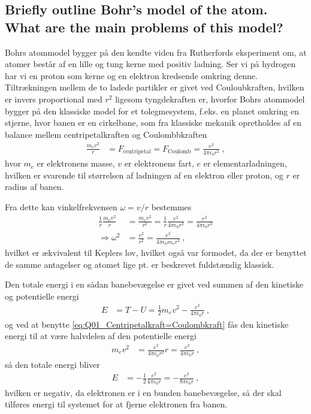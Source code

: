 \subsection{Briefly outline Bohr's model of the atom. What are the main problems of this model?}

Bohrs atommodel bygger på den kendte viden fra Rutherfords eksperiment om, at atomer består af en lille og tung kerne med positiv ladning. Ser vi på hydrogen har vi en proton som kerne og en elektron kredsende omkring denne. Tiltrækningen mellem de to ladede partikler er givet ved Couloubkraften, hvilken er invers proportional med $r^2$ ligesom tyngdekraften er, hvorfor Bohrs atommodel bygger på den klassiske model for et tolegmesystem, f.eks. en planet omkring en stjerne, hvor banen er en cirkelbane, som fra klassiske mekanik opretholdes af en balance mellem centripetalkraften og Coulombbkraften
\begin{align} \label{eq:Q01_Centripetalkraft=Coulombkraft}
	\frac{m_e v^2}{r} &= F_\text{centripetal} = F_\text{Coulomb} = \frac{e^2}{4\pi\epsilon_0 r^2} \: ,
\end{align}
hvor $m_e$ er elektronens masse, $v$ er elektronens fart, $e$ er elementarladningen, hvilken er svarende til størrelsen af ladningen af en elektron eller proton, og $r$ er radius af banen.

Fra dette kan vinkelfrekvensen $\omega = v/r$ bestemmes
\begin{align}
    \frac{1}{r}\frac{m_e v^2}{r} &= \frac{m_e v^2}{r^2} = \frac{1}{r}\frac{e^2}{4\pi\epsilon_0 r^2} = \frac{e^2}{4\pi\epsilon_0 r^3} \nonumber\\
    \Rightarrow \omega^2 &= \frac{v^2}{r^2} = \frac{e^2}{4\pi\epsilon_0 m_e r^3} \: ,
\end{align}
hvilket er ækvivalent til Keplers lov, hvilket også var formodet, da der er benyttet de samme antagelser og atomet lige pt. er beskrevet fuldstændig klassisk.

Den totale energi i en sådan banebevægelse er givet ved summen af den kinetiske og potentielle energi
\begin{align}
    E &= T - U = \frac{1}{2}m_e v^2 - \frac{e^2}{4\pi\epsilon_0 r} \: ,
\end{align}
og ved at benytte \cref{eq:Q01_Centripetalkraft=Coulombkraft} fås den kinetiske energi til at være halvdelen af den potentielle energi
\begin{align}
    m_e v^2 &= \frac{e^2}{4\pi\epsilon_0 r^2}r = \frac{e^2}{4\pi\epsilon_0 r} \: ,
\end{align}
så den totale energi bliver
\begin{align} \label{eq:Q01_TotalenergiIHydrogenAtom}
    E &= - \frac{1}{2}\frac{e^2}{4\pi\epsilon_0 r} = - \frac{e^2}{8\pi\epsilon_0 r} \: ,
\end{align}
hvilken er negativ, da elektronen er i en bunden banebevægelse, så der skal tilføres energi til systemet for at fjerne elektronen fra banen.

